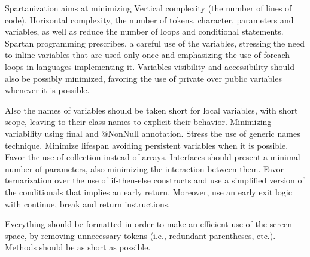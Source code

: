 Spartanization aims at minimizing Vertical complexity (the number of lines of code),
Horizontal complexity, the number of tokens, character, parameters and variables,
as well as reduce the number of loops and conditional statements.
Spartan programming prescribes, a careful use of the variables, stressing the need
to inline variables that are used only once and emphasizing the use of foreach loops
in languages implementing it. Variables visibility and accessibility should also be
possibly minimized, favoring the use of private over public variables whenever it
is possible.

Also the names of variables should be taken short for local variables, with short scope,
leaving to their class names to explicit their behavior. Minimizing variability using
final and @NonNull annotation. Stress the use of generic names technique. Minimize lifespan
avoiding persistent variables when it is possible. Favor the use of collection instead
of arrays. Interfaces should present a minimal number of parameters, also minimizing
the interaction between them. Favor ternarization over the use of if-then-else constructs
and use a simplified version of the conditionals that implies an early return. Moreover,
use an early exit logic with continue, break and return instructions.

Everything should be formatted in order to make an efficient use of the screen space,
by removing unnecessary tokens (i.e., redundant parentheses, etc.).
Methods should be as short as possible.
